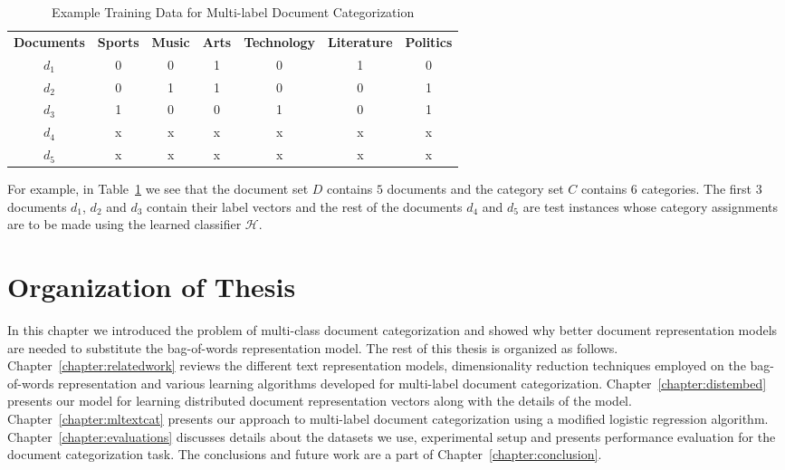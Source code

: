 \begin{table}[h!]
\tabcolsep=0.1cm
\footnotesize
\begin{center}
\begin{tabular}{c@{\hskip5mm} c c c c c c}
\toprule
\textbf{Documents}	&	\textbf{Sports} & \textbf{Music} & \textbf{Arts} & \textbf{Technology}  & \textbf{Literature} & \textbf{Politics}\\
\cmidrule{1-1}
\cmidrule{2-7}
$d_{1}$ & 0 & 0 & 1 & 0 & 1 & 0\\
$d_{2}$ & 0 & 1 & 1 & 0 & 0 & 1\\
$d_{3}$ & 1 & 0 & 0 & 1 & 0 & 1\\
$d_{4}$ & x & x & x & x & x & x\\
$d_{5}$ & x & x & x & x & x & x\\
\bottomrule         
\end{tabular}
\caption{\label{traindata:example:table}\footnotesize {Example Training Data for Multi-label Document Categorization}}
\end{center}
\end{table}

For example, in Table~\ref{traindata:example:table} we see that the document set $D$ contains $5$ documents and the category set $C$ contains $6$ categories. The first $3$ documents $d_{1}$, $d_{2}$ and $d_{3}$ contain their label vectors and the rest of the documents $d_{4}$ and $d_{5}$ are test instances whose category assignments are to be made using the learned classifier $\mathcal{H}$.

\section{Organization of Thesis}
In this chapter we introduced the problem of multi-class document categorization and showed why better document representation models are needed to substitute the bag-of-words representation model. The rest of this thesis is organized as follows. Chapter~\ref{chapter:relatedwork} reviews the different text representation models, dimensionality reduction techniques employed on the bag-of-words representation and various learning algorithms developed for multi-label document categorization. Chapter~\ref{chapter:distembed} presents our model for learning distributed document representation vectors along with the details of the model. Chapter~\ref{chapter:mltextcat} presents our approach to multi-label document categorization using a modified logistic regression algorithm. Chapter~\ref{chapter:evaluations} discusses details about the datasets we use, experimental setup and presents performance evaluation for the document categorization task. The conclusions and future work are a part of Chapter~\ref{chapter:conclusion}.






